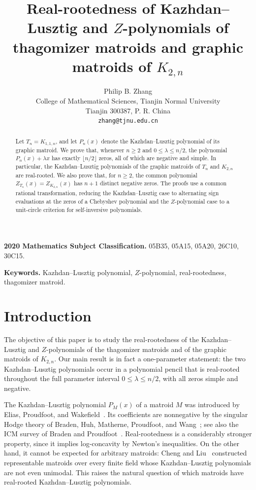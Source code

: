 \documentclass[11pt]{article}
\title{Real-rootedness of Kazhdan--Lusztig and $Z$-polynomials of thagomizer matroids and graphic matroids of $K_{2,n}$}
\author{Philip B. Zhang\\[2pt]
\small College of Mathematical Sciences, Tianjin Normal University\\
\small Tianjin 300387, P. R. China\\
\small \texttt{zhang@tjnu.edu.cn}}
\date{}
\theoremstyle{plain}
\theoremstyle{remark}
\begin{document}
\maketitle

\begin{abstract}
Let $T_n=K_{1,1,n}$, and let $P_n(x)$ denote the Kazhdan--Lusztig polynomial of its graphic matroid. We prove that, whenever $n\ge2$ and $0\le\lambda\le n/2$, the polynomial $P_n(x)+\lambda x$ has exactly $\lfloor n/2\rfloor$ zeros, all of which are negative and simple.  In particular, the Kazhdan--Lusztig polynomials of the graphic matroids of $T_n$ and $K_{2,n}$ are real-rooted. We also prove that, for $n\ge2$, the common polynomial $Z_{T_n}(x)=Z_{K_{2,n}}(x)$ has $n+1$ distinct negative zeros. The proofs use a common rational transformation, reducing the Kazhdan--Lusztig case to alternating sign evaluations at the zeros of a Chebyshev polynomial and the $Z$-polynomial case to a unit-circle criterion for self-inversive polynomials.
\end{abstract}

\noindent\textbf{2020 Mathematics Subject Classification.} 05B35, 05A15, 05A20, 26C10, 30C15.\par
\smallskip
\noindent\textbf{Keywords.} Kazhdan--Lusztig polynomial, $Z$-polynomial,
real-rootedness, thagomizer matroid.

\section{Introduction}

The objective of this paper is to study the real-rootedness of the
Kazhdan--Lusztig and $Z$-polynomials of the thagomizer matroids and of
the graphic matroids of $K_{2,n}$.  Our main result is in fact a
one-parameter statement: the two Kazhdan--Lusztig polynomials occur in
a polynomial pencil that is real-rooted throughout the full parameter
interval $0\le\lambda\le n/2$, with all zeros simple and negative.

The Kazhdan--Lusztig polynomial $P_M(x)$ of a matroid $M$ was
introduced by Elias, Proudfoot, and Wakefield~\cite{EliasProudfootWakefield}.
Its coefficients are nonnegative by the singular Hodge theory of
Braden, Huh, Matherne, Proudfoot, and Wang~\cite{BradenHuhMatherneProudfootWang};
see also the ICM survey of Braden and Proudfoot~\cite{BradenProudfootICM}.
Real-rootedness is a considerably stronger property, since it implies
log-concavity by Newton's inequalities.  On the other hand, it cannot
be expected for arbitrary matroids: Cheng and Liu~\cite{ChengLiuNonunimodal}
constructed representable matroids over every finite field whose
Kazhdan--Lusztig polynomials are not even unimodal.  This raises the
natural question of which matroids have real-rooted Kazhdan--Lusztig
polynomials.
\end{document}
